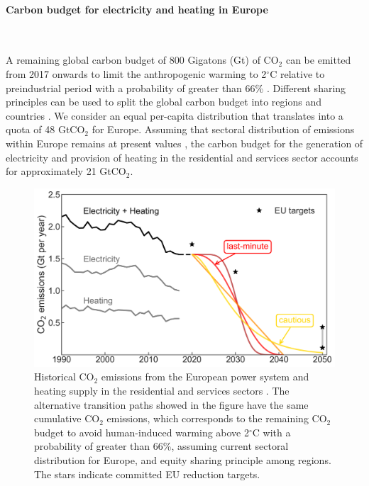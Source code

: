 \documentclass[5p]{elsarticle} %
\begin{document}
\paragraph{\textbf{Carbon budget for electricity and heating in Europe}} \

A remaining global carbon budget of 800 Gigatons (Gt) of CO$_2$ can be emitted from 2017 onwards to limit the anthropogenic warming to 2$^{\circ}$C relative to preindustrial period with a probability of greater than 66\% \cite{Figueres_2017, blog_budget}. Different sharing principles can be used to split the global carbon budget into regions and countries \cite{Raupach_2014}. We consider an equal per-capita distribution that translates into a quota of 48 GtCO$_2$ for Europe. Assuming that sectoral distribution of emissions within Europe remains at present values \cite{UNFCCC_inventory}, the carbon budget for the generation of electricity and provision of heating in the residential and services sector accounts for approximately 21 GtCO$_2$.

\begin{figure}[!h]
\centering
	\includegraphics[width=\columnwidth]{figures/carbon_budget.png}
\caption{Historical CO$_2$ emissions from the European power system and heating supply in the residential and services sectors \cite{UNFCCC_inventory}. The alternative transition paths showed in the figure have the same cumulative CO$_2$ emissions, which corresponds to the remaining CO$_2$ budget to avoid human-induced warming above 2$^{\circ}$C with a probability of greater than 66\%, assuming current sectoral distribution for Europe, and equity sharing principle among regions. The stars indicate committed EU reduction targets.} \label{fig_carbon_budget} 
\end{figure}
\end{document}
